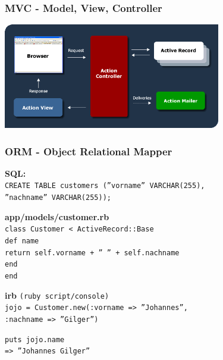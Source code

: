 \begin{frame}
  \frametitle{MVC - Model, View, Controller}
  \begin{center}
    \includegraphics[width=9.5cm]{img/mvc_rails.png}
  \end{center}
\end{frame}

\begin{frame}
  \frametitle{ORM - Object Relational Mapper}
  {\bf \small SQL:} \\
  {\tt \small CREATE TABLE customers (''vorname'' VARCHAR(255),} \\
  {\tt \small \enskip ''nachname'' VARCHAR(255));} \\
  \vspace{0.3cm}
  \pause
  
  {\bf \small app/models/customer.rb} \\
  {\tt \small class Customer < ActiveRecord::Base} \\
  {\tt \small \enskip def name} \\
  {\tt \small \enskip \enskip return self.vorname + '' '' + self.nachname} \\
  {\tt \small \enskip end} \\
  {\tt \small end} \\
  \vspace{0.3cm}
  \pause

  {\bf \small irb} {\small \tt (ruby script/console)} \\
  {\tt \small jojo = Customer.new(:vorname => ''Johannes'',} \\
  {\tt \small \enskip :nachname => ''Gilger'')} \\
  \vspace{0.3cm}
  \pause

  {\tt \small puts jojo.name} \\
  {\tt \small {\color{green}=> ''Johannes Gilger''}}
\end{frame}


